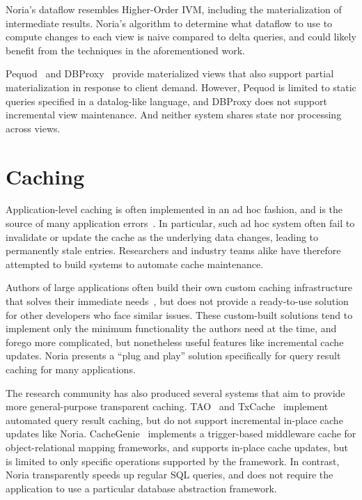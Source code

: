 Noria's dataflow resembles Higher-Order IVM, including the materialization of
intermediate results. Noria's algorithm to determine what dataflow to use to
compute changes to each view is naive compared to delta queries, and could
likely benefit from the techniques in the aforementioned work.

Pequod~\cite{pequod} and DBProxy~\cite{dbproxy} provide materialized views that
also support partial materialization in response to client demand. However,
Pequod is limited to static queries specified in a datalog-like language, and
DBProxy does not support incremental view maintenance. And neither system shares
state nor processing across views.

\section{Caching}

Application-level caching is often implemented in an ad hoc fashion, and is the
source of many application errors~\cite{ad-hoc-caching}. In particular, such ad
hoc system often fail to invalidate or update the cache as the underlying data
changes, leading to permanently stale entries. Researchers and industry teams
alike have therefore attempted to build systems to automate cache maintenance.

Authors of large applications often build their own custom caching
infrastructure that solves their immediate needs~\cite{facebook-memcache,
flannel}, but does not provide a ready-to-use solution for other developers who
face similar issues. These custom-built solutions tend to implement only the
minimum functionality the authors need at the time, and forego more complicated,
but nonetheless useful features like incremental cache updates. Noria presents a
``plug and play'' solution specifically for query result caching for many
applications.

The research community has also produced several systems that aim to provide
more general-purpose transparent caching. TAO~\cite{tao} and
TxCache~\cite{txcache} implement automated query result caching, but do not
support incremental in-place cache updates like Noria.
CacheGenie~\cite{cachegenie} implements a trigger-based middleware cache for
object-relational mapping frameworks, and supports in-place cache updates, but
is limited to only specific operations supported by the framework. In contrast,
Noria transparently speeds up regular SQL queries, and does not require the
application to use a particular database abstraction framework.

